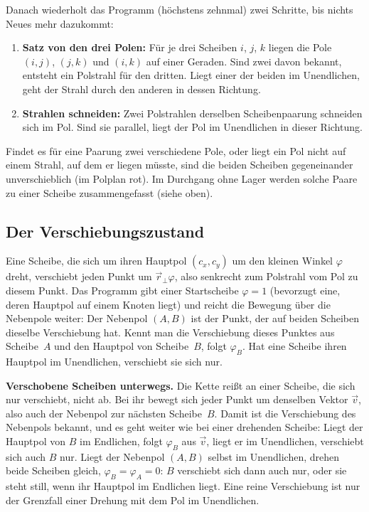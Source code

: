 Danach wiederholt das Programm (höchstens zehnmal) zwei Schritte, bis nichts Neues mehr dazukommt:

\begin{enumerate}
  \item \textbf{Satz von den drei Polen:} Für je drei Scheiben $i$, $j$, $k$ liegen die Pole
        $(i,j)$, $(j,k)$ und $(i,k)$ auf einer Geraden. Sind zwei davon bekannt, entsteht ein
        Polstrahl für den dritten. Liegt einer der beiden im Unendlichen, geht der Strahl durch
        den anderen in dessen Richtung.
  \item \textbf{Strahlen schneiden:} Zwei Polstrahlen derselben Scheibenpaarung schneiden sich im
        Pol. Sind sie parallel, liegt der Pol im Unendlichen in dieser Richtung.
\end{enumerate}

Findet es für eine Paarung zwei verschiedene Pole, oder liegt ein Pol nicht auf einem Strahl, auf
dem er liegen müsste, sind die beiden Scheiben gegeneinander unverschieblich (im Polplan rot). Im
Durchgang ohne Lager werden solche Paare zu einer Scheibe zusammengefasst (siehe oben).

\subsection{Der Verschiebungszustand}

Eine Scheibe, die sich um ihren Hauptpol $(c_x, c_y)$ um den kleinen Winkel $\varphi$ dreht,
verschiebt jeden Punkt um $\vec r_\perp \varphi$, also senkrecht zum Polstrahl vom Pol zu diesem
Punkt. Das Programm gibt einer Startscheibe $\varphi = 1$ (bevorzugt eine, deren Hauptpol auf einem
Knoten liegt) und reicht die Bewegung über die Nebenpole weiter: Der Nebenpol $(A,B)$ ist der Punkt,
der auf beiden Scheiben dieselbe Verschiebung hat. Kennt man die Verschiebung dieses Punktes aus
Scheibe~$A$ und den Hauptpol von Scheibe~$B$, folgt $\varphi_B$. Hat eine Scheibe ihren Hauptpol im
Unendlichen, verschiebt sie sich nur.

\textbf{Verschobene Scheiben unterwegs.} Die Kette reißt an einer Scheibe, die sich nur verschiebt,
nicht ab. Bei ihr bewegt sich jeder Punkt um denselben Vektor $\vec v$, also auch der Nebenpol zur
nächsten Scheibe~$B$. Damit ist die Verschiebung des Nebenpols bekannt, und es geht weiter wie bei
einer drehenden Scheibe: Liegt der Hauptpol von $B$ im Endlichen, folgt $\varphi_B$ aus $\vec v$,
liegt er im Unendlichen, verschiebt sich auch $B$ nur. Liegt der Nebenpol $(A,B)$ selbst im
Unendlichen, drehen beide Scheiben gleich, $\varphi_B = \varphi_A = 0$: $B$ verschiebt sich dann auch
nur, oder sie steht still, wenn ihr Hauptpol im Endlichen liegt. Eine reine Verschiebung ist nur der
Grenzfall einer Drehung mit dem Pol im Unendlichen.

